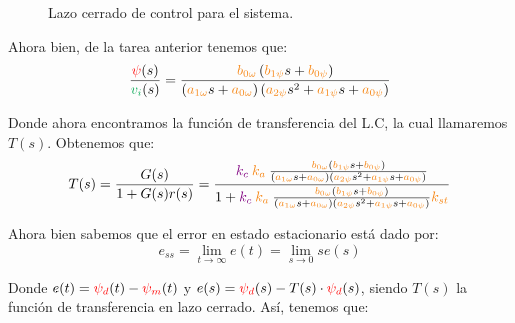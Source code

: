 \begin{figure}[h]
  \caption{Lazo cerrado de control para el sistema.}\label{fig:diag-lc}
\end{figure}


Ahora bien, de la tarea anterior tenemos que:
\begin{equation}
  \frac{\rojo{\psi}(s)}{\verd{v_i}(s)} =
  \frac{\nara{\nara{b_{0\omega}}}\left(\nara{b_{1\psi}}s + \nara{b_{0\psi}}\right)}
  {\left(\nara{a_{1\omega}}s + \nara{a_{0\omega}}\right)\left(\nara{a_{2\psi}}s^{2} + \nara{a_{1\psi}}s + \nara{a_{0\psi}}\right)}
\end{equation}

Donde ahora encontramos la función de transferencia del L.C, la cual llamaremos
\(T(s)\). Obtenemos que:
\begin{equation}
  T(s) = \frac{G(s)}{1 + G(s)r(s)} = \dfrac{\mora{k_c}\nara{k_a} \frac{\nara{\nara{b_{0\omega}}}\left(\nara{b_{1\psi}}s + \nara{b_{0\psi}}\right)}
  {\left(\nara{a_{1\omega}}s + \nara{a_{0\omega}}\right)\left(\nara{a_{2\psi}}s^{2} + \nara{a_{1\psi}}s + \nara{a_{0\psi}}\right)}}{1+\mora{k_c}\nara{k_a} \frac{\nara{\nara{b_{0\omega}}}\left(\nara{b_{1\psi}}s + \nara{b_{0\psi}}\right)}
  {\left(\nara{a_{1\omega}}s + \nara{a_{0\omega}}\right)\left(\nara{a_{2\psi}}s^{2} + \nara{a_{1\psi}}s + \nara{a_{0\psi}}\right)}\nara{k_{st}}}
\end{equation}


Ahora bien sabemos que el error en estado estacionario está dado por:
\begin{equation}
  e_{ss} = \lim_{t \to \infty} e(t) = \lim_{s \to 0} s e(s)
\end{equation}

Donde \( e(t) = \mathbin{\color{red}\psi_{d}}(t) - \mathbin{\color{red}\psi_{m}}(t) \) y \( e(s) = \mathbin{\color{red}\psi_d}(s) - T(s) \cdot \mathbin{\color{red}\psi_d}(s) \), siendo \( T(s) \) la función de transferencia en lazo cerrado. Así, tenemos que:

